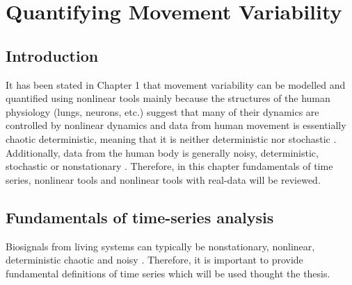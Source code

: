 
\chapter{Quantifying Movement Variability}

%


\section{Introduction}


It has been stated in Chapter 1 that movement variability can be modelled
and quantified using nonlinear tools mainly because the structures of the 
human physiology (lungs, neurons, etc.) suggest that many of their dynamics 
are controlled by nonlinear dynamics \citep{goldberger1990}
and data from human movement is essentially chaotic deterministic, 
meaning that it is neither deterministic nor stochastic 
\citep{hatze1986, preatoni2010, preatoni2013, stergiou2006}. 
Additionally, data from the human body is 
generally noisy, deterministic, stochastic or nonstationary 
\citep{newell1998}.
Therefore, in this chapter fundamentals of time series, nonlinear tools and
nonlinear tools with real-data will be reviewed.


%

\section{Fundamentals of time-series analysis}
Biosignals from living systems can typically be nonstationary, nonlinear, 
deterministic chaotic and noisy \citep{klonowski2007, caballero2014, 
wijnants2009, gomezgarcia2014, stergiou2006, harbourne2009, stergiou2011,
hatze1986, newell1998}. Therefore, it is important to provide fundamental 
definitions of time series which will be used thought the thesis.

